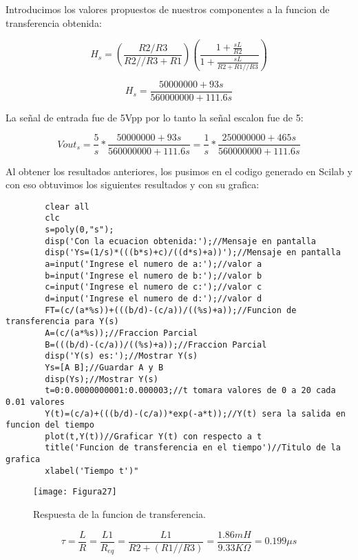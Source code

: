\documentclass{report}
\newcounter{ns}
\begin{document}
	Introducimos los valores propuestos de nuestros componentes a la funcion de transferencia obtenida:
	
	
	
	\begin{equation*}
		H_s= \left(\frac{R2/R3}{R2//R3+R1}\right)\left(\frac{1+\frac{sL}{R2}}{1+\frac{sL}{R2+R1//R3}}\right)
	\end{equation*}
	
	\begin{equation*}
		H_s=\frac{50000000+93s}{560000000+111.6s}
	\end{equation*}
	
	La señal de entrada fue de 5Vpp por lo tanto la señal escalon fue de 5:
	
	\begin{equation*}
		Vout_s=\frac{5}{s}*\frac{50000000+93s}{560000000+111.6s}=\frac{1}{s}*\frac{250000000+465s}{560000000+111.6s}
	\end{equation*}

	Al obtener los resultados anteriores, los pusimos en el codigo generado en Scilab y con eso obtuvimos los siguientes resultados y con su grafica:
	
	\begin{lstlisting}
		clear all
		clc
		s=poly(0,"s");
		disp('Con la ecuacion obtenida:');//Mensaje en pantalla
		disp('Ys=(1/s)*(((b*s)+c)/((d*s)+a))');//Mensaje en pantalla
		a=input('Ingrese el numero de a:');//valor a
		b=input('Ingrese el numero de b:');//valor b
		c=input('Ingrese el numero de c:');//valor c
		d=input('Ingrese el numero de d:');//valor d
		FT=(c/(a*%s))+(((b/d)-(c/a))/((%s)+a));//Funcion de transferencia para Y(s)
		A=(c/(a*%s));//Fraccion Parcial
		B=(((b/d)-(c/a))/((%s)+a));//Fraccion Parcial
		disp('Y(s) es:');//Mostrar Y(s)
		Ys=[A B];//Guardar A y B
		disp(Ys);//Mostrar Y(s)
		t=0:0.0000000001:0.000003;//t tomara valores de 0 a 20 cada 0.01 valores
		Y(t)=(c/a)+(((b/d)-(c/a))*exp(-a*t));//Y(t) sera la salida en funcion del tiempo
		plot(t,Y(t))//Graficar Y(t) con respecto a t
		title('Funcion de transferencia en el tiempo')//Titulo de la grafica
		xlabel('Tiempo t')"
	\end{lstlisting}
		
	\begin{figure}[H]
		\centering
		\texttt{[image: Figura27]}
		\caption{ Respuesta de la funcion de transferencia.}
		\label{fig:figura100}
	\end{figure}
		
	\begin{equation}
		\tau=\frac{L}{R}=\frac{L1}{R_{eq}}=\frac{L1}{R2+(R1//R3)}=\frac{1.86mH}{9.33K\Omega}=0.199{\mu}s
	\end{equation}
	
\end{document}
